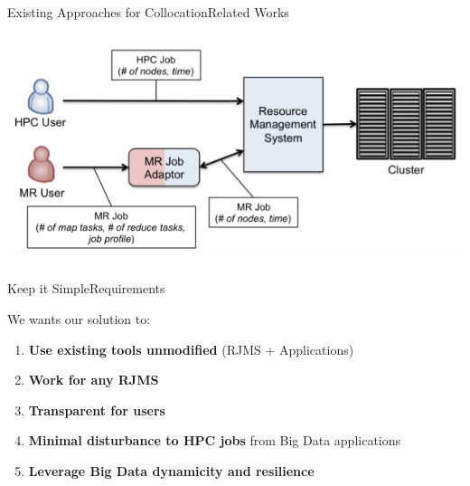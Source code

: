 \documentclass[10pt, compress, titleprogressbar, aspectratio=169]{beamer}
\begin{document}
\begin{frame}{Existing Approaches for Collocation}{Related Works}
\begin{columns}
\begin{column}[t]{0.5\textwidth}
                    \begin{center}
                        \includegraphics[width=0.8\linewidth,height=\textheight,keepaspectratio]{./img/scheduler_adaptor.png}
                    \end{center}
                \end{column}
            \end{columns}
        \end{frame}


        \begin{frame}{Keep it Simple}{Requirements}
            \begin{center}
                \begin{minipage}{0.70\textwidth}
                    \begin{exampleblock}{We wants our solution to:}
                        \begin{enumerate}
                            \item \textbf{Use existing tools unmodified} (RJMS + Applications)
                                \vspace{1em}
                            \item \textbf{Work for any RJMS}
                                \vspace{1em}
                            \item \textbf{Transparent for users}
                                \vspace{1em}
                            \item \textbf{Minimal disturbance to HPC jobs} from Big Data applications
                                \vspace{1em}
                            \item \textbf{Leverage Big Data dynamicity and resilience}
                        \end{enumerate}
                    \end{exampleblock}
                \end{minipage}
            \end{center}
        \end{frame}
\end{document}
